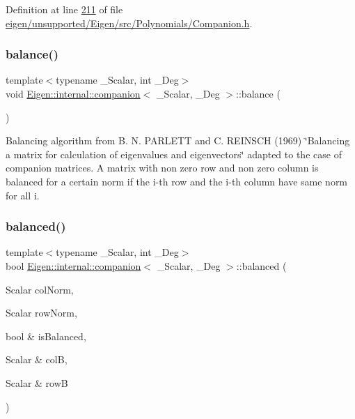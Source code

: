 Definition at line \hyperlink{eigen_2unsupported_2_eigen_2src_2_polynomials_2_companion_8h_source_l00211}{211} of file \hyperlink{eigen_2unsupported_2_eigen_2src_2_polynomials_2_companion_8h_source}{eigen/unsupported/\+Eigen/src/\+Polynomials/\+Companion.\+h}.

\mbox{\label{class_eigen_1_1internal_1_1companion_a7362d054f04f6d554fb6c8a279287000}} 
\subsubsection{\texorpdfstring{balance()}{balance()}\hspace{0.1cm}{\footnotesize\ttfamily [2/2]}}
{\footnotesize\ttfamily template$<$typename \+\_\+\+Scalar, int \+\_\+\+Deg$>$ \\
void \hyperlink{class_eigen_1_1internal_1_1companion}{Eigen\+::internal\+::companion}$<$ \+\_\+\+Scalar, \+\_\+\+Deg $>$\+::balance (\begin{DoxyParamCaption}{ }\end{DoxyParamCaption})}

Balancing algorithm from B. N. P\+A\+R\+L\+E\+TT and C. R\+E\+I\+N\+S\+CH (1969) \char`\"{}\+Balancing a matrix for calculation of eigenvalues and eigenvectors\char`\"{} adapted to the case of companion matrices. A matrix with non zero row and non zero column is balanced for a certain norm if the i-\/th row and the i-\/th column have same norm for all i. \mbox{\label{class_eigen_1_1internal_1_1companion_ac5c7b024fdd218ea68165bd948f48e83}} 
\subsubsection{\texorpdfstring{balanced()}{balanced()}\hspace{0.1cm}{\footnotesize\ttfamily [1/2]}}
{\footnotesize\ttfamily template$<$typename \+\_\+\+Scalar, int \+\_\+\+Deg$>$ \\
bool \hyperlink{class_eigen_1_1internal_1_1companion}{Eigen\+::internal\+::companion}$<$ \+\_\+\+Scalar, \+\_\+\+Deg $>$\+::balanced (\begin{DoxyParamCaption}\item[{Scalar}]{col\+Norm,  }\item[{Scalar}]{row\+Norm,  }\item[{bool \&}]{is\+Balanced,  }\item[{Scalar \&}]{colB,  }\item[{Scalar \&}]{rowB }\end{DoxyParamCaption})\hspace{0.3cm}{\ttfamily [protected]}}

